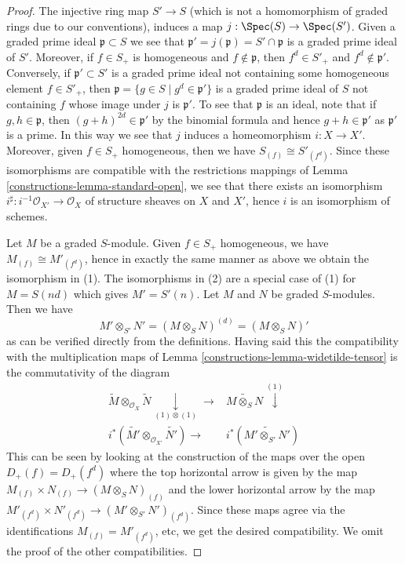 \begin{proof}

The injective ring map $S' \to S$ (which is not a homomorphism of graded rings
due to our conventions), induces a map $j : \Spec(S) \to \Spec(S')$.
Given a graded prime ideal $\mathfrak p \subset S$ we see that
$\mathfrak p' = j(\mathfrak p) = S' \cap \mathfrak p$
is a graded prime ideal of $S'$.
Moreover, if $f \in S_+$ is homogeneous and $f \not \in \mathfrak p$, then
$f^d \in S'_+$ and $f^d \not \in \mathfrak p'$. Conversely, if
$\mathfrak p' \subset S'$ is a graded prime ideal not containing some
homogeneous element $f \in S'_+$, then
$\mathfrak p = \{g \in S \mid g^d \in \mathfrak p'\}$ is a
graded prime ideal of $S$ not containing $f$ whose image under $j$
is $\mathfrak p'$. To see that $\mathfrak p$ is an ideal, note
that if $g, h \in \mathfrak p$, then
$(g + h)^{2d} \in \mathfrak p'$ by the binomial formula
and hence $g + h \in \mathfrak p'$ as $\mathfrak p'$ is a prime.
In this way we see that $j$ induces a homeomorphism $i : X \to X'$.
Moreover, given $f \in S_+$ homogeneous, then we have
$S_{(f)} \cong S'_{(f^d)}$. Since these isomorphisms are compatible
with the restrictions mappings of
Lemma \ref{constructions-lemma-standard-open}, we see that there exists an
isomorphism $i^\sharp : i^{-1}\mathcal{O}_{X'} \to \mathcal{O}_X$ of
structure sheaves on $X$ and $X'$, hence $i$ is an isomorphism
of schemes.

\medskip\noindent
Let $M$ be a graded $S$-module. Given $f \in S_+$ homogeneous, we have
$M_{(f)} \cong M'_{(f^d)}$, hence in exactly the same manner as above
we obtain the isomorphism in (1). The isomorphisms in (2) are a special
case of (1) for $M = S(nd)$ which gives $M' = S'(n)$. Let $M$ and $N$
be graded $S$-modules. Then we have
$$
M' \otimes_{S'} N' =
(M \otimes_S N)^{(d)} =
(M \otimes_S N)'
$$
as can be verified directly from the definitions. Having said this
the compatibility with the multiplication maps of
Lemma \ref{constructions-lemma-widetilde-tensor} is the commutativity of the diagram
$$
\begin{array}{cc}\widetilde M \otimes_{\mathcal{O}_X} \widetilde N
\underset{(1) \otimes (1)}{\downarrow}\longrightarrow & \widetilde{M \otimes_S N} \overset{(1)}{\downarrow} \\ i^*(\widetilde{M'} \otimes_{\mathcal{O}_{X'}} \widetilde{N'}) \longrightarrow & i^*(\widetilde{M' \otimes_{S'} N'})\end{array}
$$
This can be seen by looking at the construction of the maps
over the open $D_+(f) = D_+(f^d)$ where the top horizontal
arrow is given by the map
$M_{(f)} \times N_{(f)} \to (M \otimes_S N)_{(f)}$
and the lower horizontal arrow by the map
$M'_{(f^d)} \times N'_{(f^d)} \to (M' \otimes_{S'} N')_{(f^d)}$.
Since these maps agree via the identifications
$M_{(f)} = M'_{(f^d)}$, etc, we get the desired compatibility.
We omit the proof of the other compatibilities.
\end{proof}


